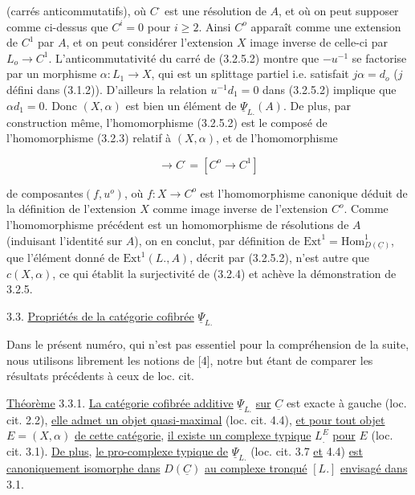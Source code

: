 (carrés anticommutatifs), où $C^{\cdot}$ est une résolution de $A$, et où on peut supposer comme ci-dessus que $C^i=0$ pour $i \geqslant 2$. Ainsi $C^o$ apparaît comme une extension de $C^1$ par $A$, et on peut considérer l'extension $X$ image inverse de celle-ci par $L_o \to C^1$. L'anticommutativité du carré de (3.2.5.2) montre que $-u^{-1}$ se factorise par un morphisme $\alpha : L_1 \longrightarrow X$, qui est un splittage partiel i.e. satisfait $j\alpha = d_o$ ($j$ défini dans (3.1.2)). D'ailleurs la relation $u^{-1}d_1 = 0$ dans (3.2.5.2) implique que $\alpha d_1 = 0$. Donc $(X,\alpha)$ est bien un élément de $\underline{\Psi}_{L.}(A)$. De plus, par construction même, l'homomorphisme (3.2.5.2) est le composé de l'homomorphisme (3.2.3) relatif à $(X,\alpha)$, et de l'homomorphisme

\begin{equation*}
[X \longrightarrow L_o] \longrightarrow C^{\cdot} = [C^o \longrightarrow C^1] 
\end{equation*}


 de composantes$(f,u^o)$, où $f: X \longrightarrow C^o$ est l'homomorphisme canonique déduit de la définition de l'extension $X$ comme image inverse de l'extension $C^o$. Comme l'homomorphisme précédent est un homomorphisme de résolutions de $A$ (induisant l'identité sur $A$), on en conclut, par définition de $\mathrm{Ext}^1 = \mathrm{Hom}^1_{D(\underline{C})}$, que l'élément donné de $\mathrm{Ext}^1(L.,A)$, décrit par (3.2.5.2), n'est autre que $c(X,\alpha)$, ce qui établit la surjectivité de (3.2.4) et achève la démonstration de 3.2.5.


3.3. \underline{Propriétés de la catégorie cofibrée} $\underline{\Psi}_{L.}$

Dans le présent numéro, qui n'est pas essentiel pour la compréhension de la suite, nous utilisons librement les notions de [4], notre but étant de comparer les résultats précédents à ceux de loc. cit.

\underline{Théorème} 3.3.1. \underline{La catégorie cofibrée additive} $\underline{\Psi}_{L.}$ \underline{sur} $\underline{C}$ est exacte à gauche (loc. cit. 2.2), \underline{elle admet un objet quasi-maximal} (loc. cit. 4.4), \underline{et pour tout objet} $E = (X,\alpha)$ \underline{de cette catégorie}, \underline{il existe un complexe typique} $L^E_{.}$ \underline{pour} $E$ (loc. cit. 3.1). \underline{De plus}, \underline{le pro-complexe typique de} $\underline{\Psi}_{L.}$ (loc. cit. 3.7 \underline{et} 4.4) \underline{est canoniquement isomorphe dans} $D(\underline{C})$ \underline{au complexe tronqué} $[L.]$ \underline{envisagé dans} 3.1.

